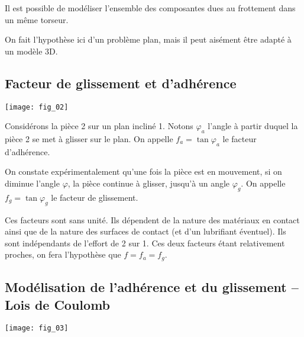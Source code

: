 \begin{remarque}
Il est possible de modéliser l'ensemble des composantes dues au frottement dans un même torseur. 

On fait l'hypothèse ici d'un problème plan, mais il peut aisément être adapté à un modèle 3D. 
\end{remarque}

\subsection{Facteur de glissement et d'adhérence}


\begin{marginfigure}
\begin{center}
\texttt{[image: fig\_02]}
\end{center}
\end{marginfigure}

Considérons la pièce 2 sur un plan incliné 1. Notons $\varphi_a$ l'angle à partir duquel la pièce 2 se met à glisser sur le plan. On appelle  $f_a=\tan\varphi_a$ le facteur d'adhérence.

On constate expérimentalement qu'une fois la pièce est en mouvement, si on diminue l'angle $\varphi$, la pièce continue à glisser, jusqu'à un angle  $\varphi_g$. On appelle \textbf{$f_g=\tan\varphi_g$} le facteur de glissement.



Ces facteurs sont sans unité. Ils dépendent de la nature des matériaux en contact ainsi que de la nature des surfaces de contact (et d'un lubrifiant éventuel). Ils sont indépendants de l'effort de 2 sur 1. Ces deux facteurs étant relativement proches, on fera l'hypothèse que $f=f_a=f_g$. 


\subsection{Modélisation de l'adhérence et du glissement -- Lois de Coulomb}

\begin{marginfigure}
\texttt{[image: fig\_03]}
\end{marginfigure}

